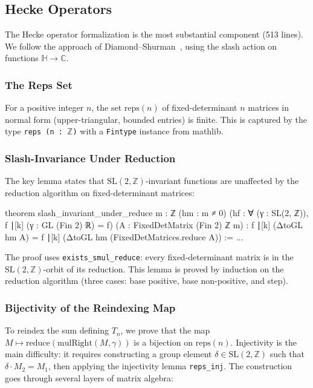 \documentclass[11pt]{article}
\theoremstyle{plain}
\theoremstyle{definition}
\theoremstyle{remark}
\begin{document}
\subsection{Hecke Operators}
\label{sec:hecke}

The Hecke operator formalization is the most substantial component (513 lines).
We follow the approach of Diamond--Shurman~\cite{diamond2005first}, using the slash action on functions $\mathbb{H}\to\mathbb{C}$.

\subsubsection{The Reps Set}

For a positive integer $n$, the set $\mathrm{reps}(n)$ of fixed-determinant $n$ matrices in normal form (upper-triangular, bounded entries) is finite.
This is captured by the type \texttt{reps (n : $\mathbb{Z}$)} with a \texttt{Fintype} instance from mathlib.

\subsubsection{Slash-Invariance Under Reduction}

The key lemma states that $\mathrm{SL}(2,\mathbb{Z})$-invariant functions are unaffected by the reduction algorithm on fixed-determinant matrices:

\begin{lean}
theorem slash_invariant_under_reduce {m : ℤ} (hm : m ≠ 0)
    (hf : ∀ (γ : SL(2, ℤ)), f ∣[k] (γ : GL (Fin 2) ℝ) = f)
    (A : FixedDetMatrix (Fin 2) ℤ m) :
    f ∣[k] (ΔtoGL hm A) = f ∣[k] (ΔtoGL hm (FixedDetMatrices.reduce A)) := ...
\end{lean}

The proof uses \texttt{exists\_smul\_reduce}: every fixed-determinant matrix is in the $\mathrm{SL}(2,\mathbb{Z})$-orbit of its reduction.
This lemma is proved by induction on the reduction algorithm (three cases: base positive, base non-positive, and step).

\subsubsection{Bijectivity of the Reindexing Map}

To reindex the sum defining $T_n$, we prove that the map $M \mapsto \mathrm{reduce}(\mathrm{mulRight}(M,\gamma))$ is a bijection on $\mathrm{reps}(n)$.
Injectivity is the main difficulty: it requires constructing a group element $\delta\in\mathrm{SL}(2,\mathbb{Z})$ such that $\delta\cdot M_2 = M_1$, then applying the injectivity lemma \texttt{reps\_inj}.
The construction goes through several layers of matrix algebra:
\end{document}
